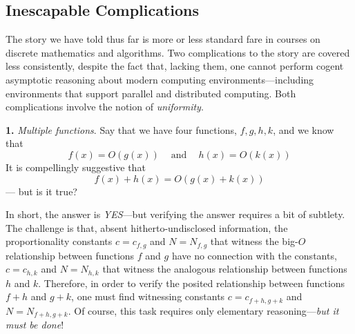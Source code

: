 \subsection{Inescapable Complications}
\label{sec:asymptotic-complication}

The story we have told thus far is more or less standard fare in courses on discrete mathematics and algorithms.  Two complications to the story are covered less consistently, despite the fact that, lacking them, one cannot perform cogent asymptotic reasoning about modern computing
environments---including environments that support parallel and distributed computing.  Both complications involve the notion of {\em uniformity}. 

\medskip

\noindent
{\bf 1.} {\em Multiple functions}.
Say that we have four functions, $f, g, h, k$, and we know that
\[ f(x) = O(g(x)) \ \ \ \  \mbox{ and } \ \ \ \ h(x) = O(k(x)) \]
It is compellingly suggestive that
\[ f(x) + h(x) = O(g(x) + k(x)) \]
--- but is it true?

\smallskip

In short, the answer is {\em YES}---but verifying the answer requires a bit of subtlety.  The challenge is that, absent hitherto-undisclosed information, the proportionality constants $c = c_{f,g}$ and $N = N_{f,g}$ that witness the big-$O$ relationship between functions $f$ and $g$ have no connection with the constants, $c = c_{h,k}$ and $N = N_{h,k}$ that witness the analogous relationship between functions $h$ and $k$.  Therefore, in order to verify the posited relationship between functions $f + h$ and $g + k$, one must find witnessing constants $c = c_{f+h, g+k}$ and $N = N_{f+h,g+k}$.  Of course, this task requires only elementary reasoning---{\em but it must be done}!

\bigskip

